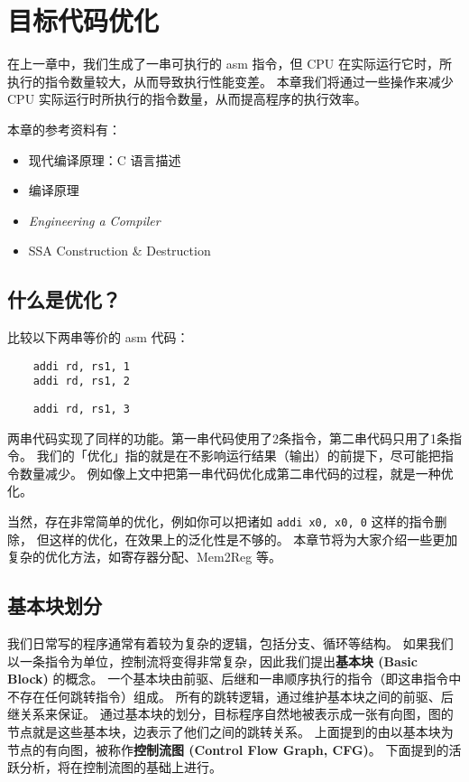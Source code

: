 \chapter{目标代码优化}

\label{chap:optimize}
在上一章中，我们生成了一串可执行的 asm 指令，但 CPU 在实际运行它时，所执行的指令数量较大，从而导致执行性能变差。
本章我们将通过一些操作来减少 CPU 实际运行时所执行的指令数量，从而提高程序的执行效率。

\begin{remark}
本章的参考资料有：
\begin{itemize}
    \item 现代编译原理：C 语言描述\cite{TigerBook}
    \item 编译原理\cite{DragonBook}
    \item \textit{Engineering a Compiler}\cite{EngineeringACompiler}
    \item SSA Construction \& Destruction\cite{SSAConstructionAndDestruction}
\end{itemize}
\end{remark}

\section{什么是优化？}

比较以下两串等价的 asm 代码：
\begin{lstlisting}
    addi rd, rs1, 1
    addi rd, rs1, 2
\end{lstlisting}
\begin{lstlisting}  
    addi rd, rs1, 3
\end{lstlisting}

两串代码实现了同样的功能。第一串代码使用了2条指令，第二串代码只用了1条指令。
我们的「优化」指的就是在不影响运行结果（输出）的前提下，尽可能把指令数量减少。
例如像上文中把第一串代码优化成第二串代码的过程，就是一种优化。

当然，存在非常简单的优化，例如你可以把诸如 \texttt{addi x0, x0, 0} 这样的指令删除，
但这样的优化，在效果上的泛化性是不够的。
本章节将为大家介绍一些更加复杂的优化方法，如寄存器分配、Mem2Reg 等。

\section{基本块划分}

我们日常写的程序通常有着较为复杂的逻辑，包括分支、循环等结构。
如果我们以一条指令为单位，控制流将变得非常复杂，因此我们提出\textbf{基本块 (Basic Block)} 的概念。
一个基本块由前驱、后继和一串顺序执行的指令（即这串指令中不存在任何跳转指令）组成。
所有的跳转逻辑，通过维护基本块之间的前驱、后继关系来保证。
通过基本块的划分，目标程序自然地被表示成一张有向图，图的节点就是这些基本块，边表示了他们之间的跳转关系。
上面提到的由以基本块为节点的有向图，被称作\textbf{控制流图 (Control Flow Graph, CFG)}。
下面提到的活跃分析，将在控制流图的基础上进行。

